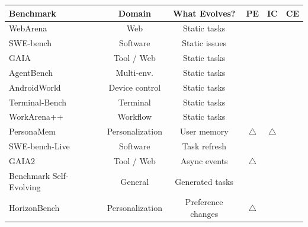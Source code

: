 \documentclass{article}
\newcommand{\cmark}{\textcolor{green!60!black}{\ding{51}}}
\newcommand{\xmark}{\textcolor{red!75!black}{\ding{55}}}
\newcommand{\pmark}{\textcolor{orange!85!black}{\textbf{$\triangle$}}}
\begin{document}
\begin{table}[t]
\centering
\small
\setlength{\tabcolsep}{4pt}
\renewcommand{\arraystretch}{1.05}
\begin{tabular}{lccccc}
\toprule
\textbf{Benchmark} 
& \textbf{Domain} 
& \textbf{What Evolves?} 
& \textbf{PE} 
& \textbf{IC} 
& \textbf{CE} \\
\midrule

WebArena \cite{zhou2023webarena}
& Web
& Static tasks
& \xmark
& \xmark
& \xmark \\

SWE-bench \cite{jimenez2024swebench}
& Software
& Static issues
& \xmark
& \xmark
& \xmark \\

GAIA \cite{mialon2024gaia}
& Tool / Web
& Static tasks
& \xmark
& \xmark
& \xmark \\

AgentBench \cite{liu2024agentbench}
& Multi-env.
& Static tasks
& \xmark
& \xmark
& \xmark \\

AndroidWorld \cite{rawles2025androidworld}
& Device control
& Static tasks
& \xmark
& \xmark
& \xmark \\

Terminal-Bench \cite{terminal-bench}
& Terminal
& Static tasks
& \xmark
& \xmark
& \xmark \\

WorkArena++ \cite{workarena++}
& Workflow
& Static tasks
& \xmark
& \xmark
& \xmark \\

PersonaMem \cite{jiang2025personamem}
& Personalization
& User memory
& \pmark
& \pmark
& \xmark \\

SWE-bench-Live \cite{li2026swe-benchl-ive}
& Software
& Task refresh
& \xmark
& \xmark
& \xmark \\

GAIA2 \cite{gaia2}
& Tool / Web
& Async events
& \pmark
& \cmark
& \xmark \\

Benchmark Self-Evolving \cite{benchmark-selfevolv}
& General
& Generated tasks
& \xmark
& \xmark
& \xmark \\

HorizonBench \cite{li2026horizonbench}
& Personalization
& Preference changes
& \pmark
& \cmark
& \xmark \\


\end{tabular}
\end{table}
\end{document}
